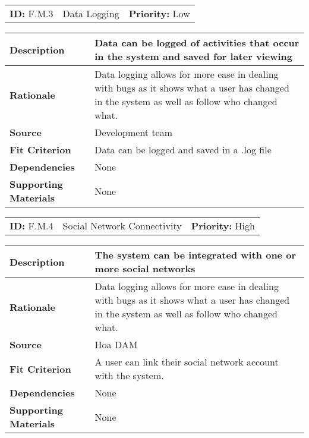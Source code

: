 \begin{table}[H]
    \begin{tabularx}{\textwidth}{| l | X | l |}
        \hline
        \textbf{ID:} F.M.3 & Data Logging & \textbf{Priority:} Low \\
    \end{tabularx}
    \begin{tabularx}{\textwidth}{| l | X |}
        \hline
        \textbf{Description} & Data can be logged of activities that occur in the system and saved for later viewing\\ \hline
        \textbf{Rationale} & Data logging allows for more ease in dealing with bugs as it shows what a user has changed in the system as well as follow who changed what.\\ \hline
        \textbf{Source} &  Development team\\ \hline
        \textbf{Fit Criterion} & Data can be logged and saved in a .log file \\ \hline
        \textbf{Dependencies} & None \\ \hline
        \textbf{Supporting Materials} & None \\ \hline
    \end{tabularx}
\end{table}

\begin{table}[H]
    \begin{tabularx}{\textwidth}{| l | X | l |}
        \hline
        \textbf{ID:} F.M.4 & Social Network Connectivity & \textbf{Priority:} High \\
    \end{tabularx}
    \begin{tabularx}{\textwidth}{| l | X |}
        \hline
        \textbf{Description} & The system can be integrated with one or more social networks\\ \hline
        \textbf{Rationale} & Data logging allows for more ease in dealing with bugs as it shows what a user has changed in the system as well as follow who changed what.\\ \hline
        \textbf{Source} &  Hoa DAM\\ \hline
        \textbf{Fit Criterion} & A user can link their social network account with the system. \\ \hline
        \textbf{Dependencies} & None \\ \hline
        \textbf{Supporting Materials} & None \\ \hline
    \end{tabularx}
\end{table}

